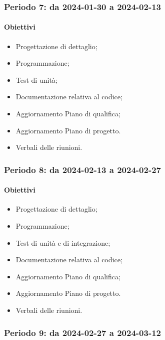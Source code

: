 \documentclass[10pt, a4paper]{article}
\begin{document}
{{{{{{{{\subsubsection{Periodo 7: da 2024-01-30 a 2024-02-13}
\paragraph{Obiettivi}
\begin{itemize}
    \item Progettazione di dettaglio;
    \item Programmazione;
    \item Test di unità;
    \item Documentazione relativa al codice;
    \item Aggiornamento Piano di qualifica;
    \item Aggiornamento Piano di progetto.
    \item Verbali delle riunioni.
\end{itemize}

\subsubsection{Periodo 8: da 2024-02-13 a 2024-02-27}
\paragraph{Obiettivi}
\begin{itemize}
    \item Progettazione di dettaglio;
    \item Programmazione;
    \item Test di unità e di integrazione;
    \item Documentazione relativa al codice;
    \item Aggiornamento Piano di qualifica;
    \item Aggiornamento Piano di progetto.
    \item Verbali delle riunioni.
\end{itemize}

\subsubsection{Periodo 9: da 2024-02-27 a 2024-03-12}
}}}}}}}}
\end{document}
